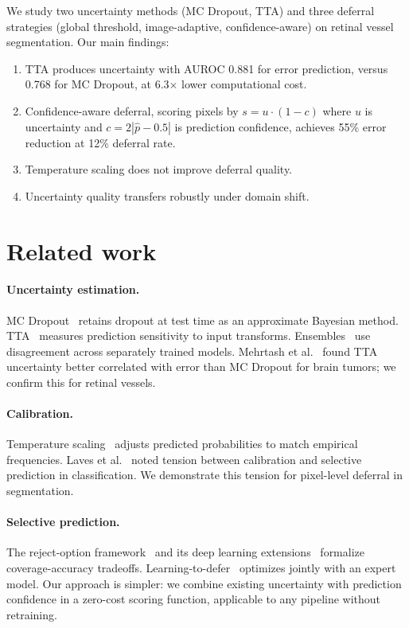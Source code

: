 \documentclass[smallextended]{svjour3}
\begin{document}
We study two uncertainty methods (MC Dropout, TTA) and three deferral
strategies (global threshold, image-adaptive, confidence-aware) on retinal
vessel segmentation. Our main findings:

\begin{enumerate}
\item TTA produces uncertainty with AUROC 0.881 for error prediction, versus
0.768 for MC Dropout, at 6.3$\times$ lower computational cost.
\item Confidence-aware deferral, scoring pixels by $s = u \cdot (1-c)$ where
$u$ is uncertainty and $c = 2|\hat{p} - 0.5|$ is prediction confidence, achieves
55\% error reduction at 12\% deferral rate.
\item Temperature scaling does not improve deferral quality.
\item Uncertainty quality transfers robustly under domain shift.
\end{enumerate}

\section{Related work}

\paragraph{Uncertainty estimation.}
MC Dropout~\cite{gal2016dropout} retains dropout at test time as an approximate
Bayesian method. TTA~\cite{wang2019aleatoric,ayhan2018test} measures prediction
sensitivity to input transforms. Ensembles~\cite{lakshminarayanan2017simple}
use disagreement across separately trained models. Mehrtash et
al.~\cite{mehrtash2020confidence} found TTA uncertainty better correlated with
error than MC Dropout for brain tumors; we confirm this for retinal vessels.

\paragraph{Calibration.}
Temperature scaling~\cite{guo2017calibration} adjusts predicted probabilities
to match empirical frequencies. Laves et al.~\cite{laves2020well} noted
tension between calibration and selective prediction in classification. We
demonstrate this tension for pixel-level deferral in segmentation.

\paragraph{Selective prediction.}
The reject-option framework~\cite{chow1970optimum,el2010foundations} and its
deep learning extensions~\cite{geifman2017selective} formalize coverage-accuracy
tradeoffs. Learning-to-defer~\cite{madras2018predict,mozannar2020consistent}
optimizes jointly with an expert model. Our approach is simpler: we combine
existing uncertainty with prediction confidence in a zero-cost scoring
function, applicable to any pipeline without retraining.
\end{document}
